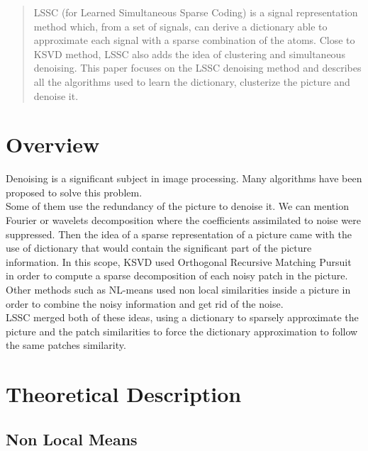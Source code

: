 \documentclass{ipol}
\begin{document}
\begin{abstract}
LSSC (for Learned Simultaneous Sparse Coding) is a signal representation method which, from a set of signals, can derive a dictionary able to approximate each signal with a sparse combination of the atoms. Close to KSVD method, LSSC also adds the idea of clustering and simultaneous denoising. This paper focuses on the LSSC denoising method and describes all the algorithms used to learn the dictionary, clusterize the picture and denoise it. 
\end{abstract} 

\section{Overview}
Denoising is a significant subject in image processing. Many algorithms have been proposed to solve this problem.\\
Some of them use the redundancy of the picture to denoise it. We can mention Fourier or wavelets decomposition where the coefficients assimilated to noise were suppressed. Then the idea of a sparse representation of a picture came with the use of dictionary that would contain the significant part of the picture information. In this scope, KSVD \cite{KSVD} used Orthogonal Recursive Matching Pursuit in order to compute a sparse decomposition of each noisy patch in the picture.\\
Other methods such as NL-means \cite{Patch02} used non local similarities inside a picture in order to combine the noisy information and get rid of the noise.\\
LSSC merged both of these ideas, using a dictionary to sparsely approximate the picture and the patch similarities to force the dictionary approximation to follow the same patches similarity.

\section{Theoretical Description}

\subsection{ Non Local Means }
\end{document}
